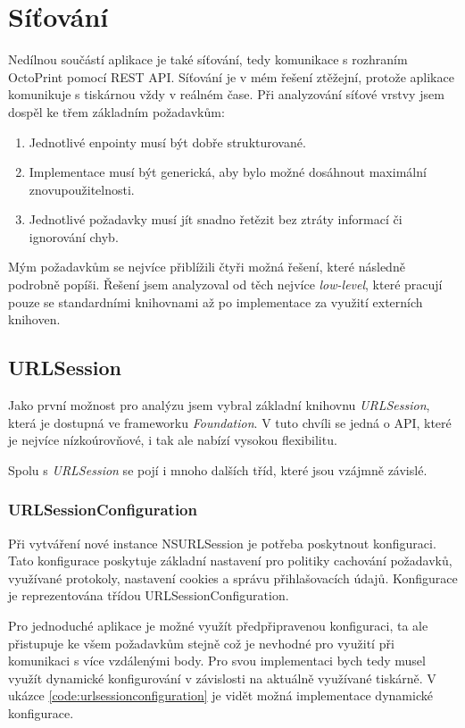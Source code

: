 \section{Síťování}\label{analyza-sitovani}

Nedílnou součástí aplikace je také síťování, tedy komunikace s rozhraním OctoPrint pomocí REST API.
Síťování je v mém řešení ztěžejní, protože aplikace komunikuje s tiskárnou vždy v reálném čase.
Při analyzování síťové vrstvy jsem dospěl ke třem základním požadavkům:

\begin{enumerate}
    \item Jednotlivé enpointy musí být dobře strukturované.
    \item Implementace musí být generická, aby bylo možné dosáhnout maximální znovupoužitelnosti.
    \item Jednotlivé požadavky musí jít snadno řetězit bez ztráty informací či ignorování chyb.
\end{enumerate}

Mým požadavkům se nejvíce přiblížili čtyři možná řešení, které následně podrobně popíši.
Řešení jsem analyzoval od těch nejvíce \textit{low-level}, které pracují pouze se standardními knihovnami až po implementace za využití externích knihoven.

\subsection{URLSession}

Jako první možnost pro analýzu jsem vybral základní knihovnu \textit{URLSession}, která je dostupná ve frameworku \textit{Foundation}.
V tuto chvíli se jedná o API, které je nejvíce nízkoúrovňové, i tak ale nabízí vysokou flexibilitu.

Spolu s \textit{URLSession} se pojí i mnoho dalších tříd, které jsou vzájmně závislé.

\subsubsection{URLSessionConfiguration}

Při vytváření nové instance NSURLSession je potřeba poskytnout konfiguraci.
Tato konfigurace poskytuje základní nastavení pro politiky cachování požadavků, využívané protokoly, nastavení cookies a správu přihlašovacích údajů.
Konfigurace je reprezentována třídou URLSessionConfiguration.

Pro jednoduché aplikace je možné využít předpřipravenou konfiguraci, ta ale přistupuje ke všem požadavkům stejně což je nevhodné pro využití při komunikaci s více vzdálenými body.
Pro svou implementaci bych tedy musel využít dynamické konfigurování v závislosti na aktuálně využívané tiskárně.
V ukázce \ref{code:urlsessionconfiguration} je vidět možná implementace dynamické konfigurace.

